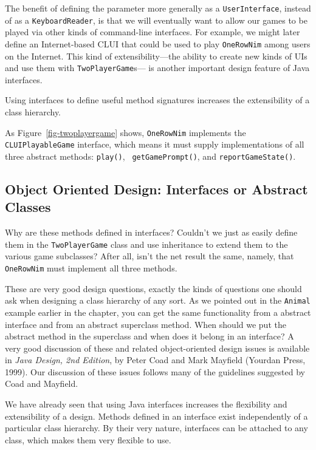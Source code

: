 \noindent The benefit of defining the parameter more generally as a
{\tt User\-Interface}, instead of as a {\tt KeyboardReader}, is that
we will eventually want to allow our games to be played via other
kinds of command-line interfaces. For example, we might later define
an Internet-based CLUI that could be used to play {\tt OneRowNim}
among users on the Internet. This kind of extensibility---the ability
to create new kinds of UIs and use them with {\tt TwoPlayerGame}s---
is another important design feature of Java interfaces.

{Using interfaces to define useful method signatures increases the
extensibility of a class hierarchy.}

As Figure~\ref{fig-twoplayergame} shows, {\tt OneRowNim} implements
the {\tt CLUIPlayable\-Game} interface, which means it must supply
implementations of all three abstract methods: {\tt play()}, {\tt
getGamePrompt()}, and {\tt reportGame\-State()}.

\subsection{Object Oriented Design: Interfaces or Abstract Classes}

Why are these methods defined in interfaces? Couldn't we just as
easily define them in the {\tt TwoPlayerGame} class and use
inheritance to extend them to the various game subclasses?  After all,
isn't the net result the same, namely, that {\tt OneRowNim} must
implement all three methods.

These are very good design questions, exactly the kinds of questions
one should ask when designing a class hierarchy of any sort. As we
pointed out in the {\tt Animal} example earlier in the chapter, you
can get the same functionality from a abstract interface and from an
abstract superclass method.  When should we put the abstract method in
the superclass and when does it belong in an interface? A very good
discussion of these and related object-oriented design issues is
available in {\em Java Design, 2nd Edition}, by Peter Coad and
Mark Mayfield (Yourdan Press, 1999). Our discussion of these issues
follows many of the guidelines suggested by Coad and Mayfield. 

We have already seen that using Java interfaces increases the
flexibility and extensibility of a design.  Methods defined in an
interface exist independently of a particular class hierarchy. By
their very nature, interfaces can be attached to any class, which
makes them very flexible to use.

